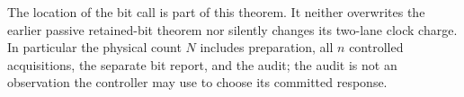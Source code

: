 The location of the bit call is part of this theorem. It neither overwrites the earlier passive retained-bit theorem nor silently changes its two-lane clock charge. In particular the physical count $N$ includes preparation, all $n$ controlled acquisitions, the separate bit report, and the audit; the audit is not an observation the controller may use to choose its committed response.
